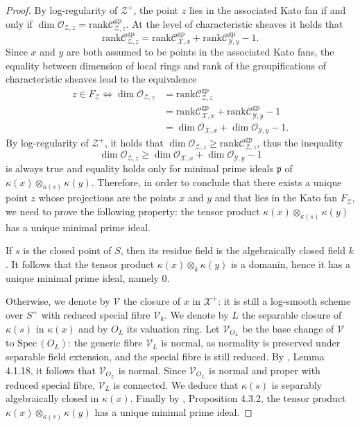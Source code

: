 \documentclass{amsart}%
\numberwithin{equation}{subsection}
\theoremstyle{plain2}
\theoremstyle{definition2}
\theoremstyle{stepstyle}
\theoremstyle{point}
\theoremstyle{subpoint}
\newcommand{\cX}{\ensuremath{\mathscr{X}}}
\newcommand{\fp}{\ensuremath{\mathfrak{p}}}
\newcommand{\caC}{\ensuremath{\mathcal{C}}}
\newcommand{\caO}{\ensuremath{\mathcal{O}}}
\newcommand{\cY}{\ensuremath{\mathscr{Y}}}
\newcommand{\cZ}{\ensuremath{\mathscr{Z}}}
\renewcommand{\cZ}{\ensuremath{\mathscr{Z}}}
\renewcommand{\cY}{\ensuremath{\mathscr{Y}}}
\newcommand{\Spec}{\ensuremath{\mathrm{Spec}\,}}
\newcommand{\rank}{\mathrm{rank}}
\begin{document}
\begin{proof}
By log-regularity of $\cZ^+$, the point $z$ lies in the associated Kato fan if and only if $\dim \caO_{\cZ,z}= \rank \caC_{\cZ,z}^{\text{gp}}$. At the level of characteristic sheaves it holds that $$\rank \caC_{\cZ,z}^{\text{gp}}= \rank \caC_{\cX,x}^{\text{gp}} + \rank \caC_{\cY,y}^{\text{gp}} - 1.$$ Since $x$ and $y$ are both assumed to be points in the associated Kato fans, the equality between dimension of local rings and rank of the groupifications of characteristic sheaves lead to the equivalence \begin{align*}
z \in F_{\cZ}  \Leftrightarrow \dim \caO_{\cZ,z} & = \rank \caC_{\cZ,z}^{\text{gp}} \\&= \rank \caC_{\cX,x}^{\text{gp}} + \rank \caC_{\cY,y}^{\text{gp}} - 1 \\
& = \dim \caO_{\cX,x} +  \dim \caO_{\cY,y} -1.
\end{align*}
By log-regularity of $\cZ^+$, it holds that $\dim \caO_{\cZ,z} \geqslant \rank \caC_{\cZ,z}^{\text{gp}}$, thus the inequality $$\dim \caO_{\cZ,z} \geqslant \dim \caO_{\cX,x} +  \dim \caO_{\cY,y} -1$$ is always true and equality holds only for minimal prime ideals $\fp$ of $\kappa(x) \otimes_{\kappa(s)} \kappa(y)$. Therefore, in order to conclude that there exists a unique point $z$ whose projections are the points $x$ and $y$ and that lies in the Kato fan $F_{\cZ}$, we need to prove the following property: the tensor product $\kappa(x) \otimes_{\kappa(s)} \kappa(y)$ has a unique minimal prime ideal. 

If $s$ is the closed point of $S$, then its residue field is the algebraically closed field $k$. It follows that the tensor product $\kappa(x) \otimes_{k} \kappa(y)$ is a domanin, hence it has a unique minimal prime ideal, namely $0$. 

Otherwise, we denote by $\mathscr{V}$ the closure of $x$ in $\cX^+$: it is still a log-smooth scheme over $S^+$ with reduced special fibre $\mathscr{V}_k$. We denote by $L$ the separable closure of $\kappa(s)$ in $\kappa(x)$ and by $O_L$ its valuation ring. Let $\mathscr{V}_{O_L}$ be the base change of $\mathscr{V}$ to $\Spec(O_L)$: the generic fibre $\mathscr{V}_L$ is normal, as normality is preserved under separable field extension,
and the special fibre is still reduced. By \cite{Liu2002}, Lemma 4.1.18, it follows that $\mathscr{V}_{O_L}$ is normal. Since $\mathscr{V}_{O_L}$ is normal and proper with reduced special fibre, $\mathscr{V}_L$ is connected.
We deduce that $\kappa(s)$ is separably algebraically closed in $\kappa(x)$. Finally by , Proposition 4.3.2, the tensor product $\kappa(x) \otimes_{\kappa(s)} \kappa(y)$ has a unique minimal prime ideal.
\end{proof}
\end{document}
